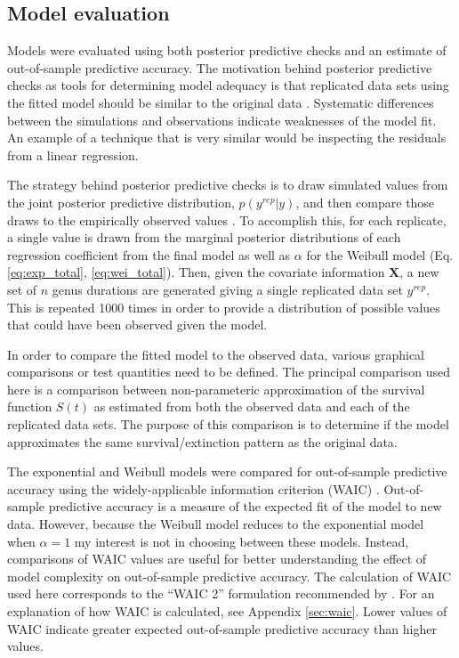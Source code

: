 \documentclass[12pt,letterpaper]{article}
\begin{document}
\subsection{Model evaluation}

Models were evaluated using both posterior predictive checks and an estimate of out-of-sample predictive accuracy. The motivation behind posterior predictive checks as tools for determining model adequacy is that replicated data sets using the fitted model should be similar to the original data \citep{Gelman2013d}. Systematic differences between the simulations and observations indicate weaknesses of the model fit. An example of a technique that is very similar would be inspecting the residuals from a linear regression.

The strategy behind posterior predictive checks is to draw simulated values from the joint posterior predictive distribution, \(p(y^{rep} | y)\), and then compare those draws to the empirically observed values \citep{Gelman2013d}. To accomplish this, for each replicate, a single value is drawn from the marginal posterior distributions of each regression coefficient from the final model as well as \(\alpha\) for the Weibull model (Eq. \ref{eq:exp_total}, \ref{eq:wei_total}). Then, given the covariate information \(\mathbf{X}\), a new set of \(n\) genus durations are generated giving a single replicated data set \(y^{rep}\). This is repeated 1000 times in order to provide a distribution of possible values that could have been observed given the model. 

In order to compare the fitted model to the observed data, various graphical comparisons or test quantities need to be defined. The principal comparison used here is a comparison between non-parameteric approximation of the survival function \(S(t)\) as estimated from both the observed data and each of the replicated data sets. The purpose of this comparison is to determine if the model approximates the same survival/extinction pattern as the original data. 

The exponential and Weibull models were compared for out-of-sample predictive accuracy using the widely-applicable information criterion (WAIC) \citep{Watanabe2010a}. Out-of-sample predictive accuracy is a measure of the expected fit of the model to new data. However, because the Weibull model reduces to the exponential model when \(\alpha = 1\) my interest is not in choosing between these models. Instead, comparisons of WAIC values are useful for better understanding the effect of model complexity on out-of-sample predictive accuracy. The calculation of WAIC used here corresponds to the ``WAIC 2'' formulation recommended by \citet{Gelman2013d}. For an explanation of how WAIC is calculated, see Appendix \ref{sec:waic}. Lower values of WAIC indicate greater expected out-of-sample predictive accuracy than higher values.
\end{document}
